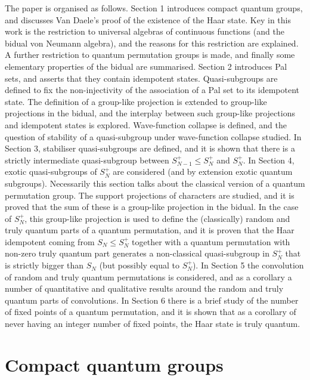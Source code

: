 \documentclass[12pt]{amsart}
\theoremstyle{remark}
\theoremstyle{remark}
\begin{document}
The paper is organised as follows. Section 1 introduces  compact quantum groups, and discusses Van Daele's proof of the existence of the Haar state. Key in this work is the restriction to universal algebras of continuous functions (and the bidual von Neumann algebra), and the reasons for this restriction are explained. A further restriction to quantum permutation groups is made, and finally some elementary properties of the bidual are summarised. Section 2 introduces Pal sets, and asserts that they contain idempotent states. Quasi-subgroups are defined to fix the non-injectivity of the association of a Pal set to its idempotent state. The definition of a group-like projection is extended to group-like projections in the bidual, and the interplay between such group-like projections and idempotent states is explored. Wave-function collapse is defined, and the question of stability of a quasi-subgroup under wave-function collapse studied. In Section 3, stabiliser quasi-subgroups are defined, and it is shown that there is a strictly intermediate quasi-subgroup between $S_{N-1}^+\leq S_N^+$ and $S_N^+$. In Section 4, exotic quasi-subgroups of $S_N^+$ are considered (and by extension exotic quantum subgroups). Necessarily this section talks about the classical version of a quantum permutation group. The support projections of characters are studied, and it is proved that the sum of these is a group-like projection in the bidual. In the case of $S_N^+$, this group-like projection is used to define the (classically) random and truly quantum parts of a quantum permutation, and it is proven that the Haar idempotent coming from $S_N\leq S_N^+$ together with a quantum permutation with non-zero truly quantum part generates a non-classical quasi-subgroup in $S_N^+$ that is strictly bigger than $S_N$ (but possibly equal to $S_N^+$). In Section 5 the convolution of random and truly quantum permutations is considered, and as a corollary a number of quantitative and qualitative results around the random and truly quantum parts of convolutions. In Section 6 there is a brief study of the number of fixed points of a quantum permutation, and it is shown that as a corollary of never having an integer number of fixed points, the Haar state is truly quantum.

\section{Compact quantum groups}
\end{document}
